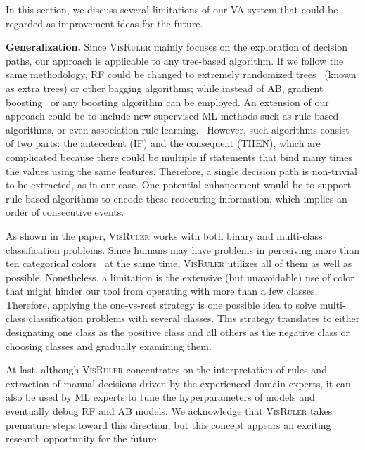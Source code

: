 In this section, we discuss several limitations of our VA system that could be regarded as improvement ideas for the future.

\textbf{Generalization.} Since \textsc{VisRuler} mainly focuses on the exploration of decision paths, our approach is applicable to any tree-based algorithm. If we follow the same methodology, RF could be changed to extremely randomized trees~\cite{Geurts2006Extremely} (known as extra trees) or other bagging algorithms; while instead of AB, gradient boosting~\cite{Ke2017LightGBM,Chen2016XGBoost} or any boosting algorithm can be employed. An extension of our approach could be to include new supervised ML methods such as rule-based algorithms, or even association rule learning.~\cite{Song2016Research} However, such algorithms consist of two parts: the antecedent (IF) and the consequent (THEN), which are complicated because there could be multiple if statements that bind many times the values using the same features. Therefore, a single decision path is non-trivial to be extracted, as in our case. One potential enhancement would be to support rule-based algorithms to encode these reoccuring information, which implies an order of consecutive events. 

As shown in the paper, \textsc{VisRuler} works with both binary and multi-class classification problems. Since humans may have problems in perceiving more than ten categorical colors~\cite{Ware2019Information} at the same time, \textsc{VisRuler} utilizes all of them as well as possible. Nonetheless, a limitation is the extensive (but unavoidable) use of color that might hinder our tool from operating with more than a few classes. Therefore, applying the one-vs-rest strategy is one possible idea to solve multi-class classification problems with several classes. This strategy translates to either designating one class as the positive class and all others as the negative class or choosing classes and gradually examining them.

At last, although \textsc{VisRuler} concentrates on the interpretation of rules and extraction of manual decisions driven by the experienced domain experts, it can also be used by ML experts to tune the hyperparameters of models and eventually debug RF and AB models. We acknowledge that \textsc{VisRuler} takes premature steps toward this direction, but this concept appears an exciting research opportunity for the future.

